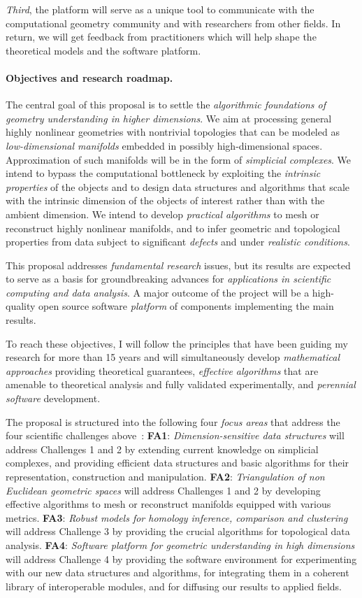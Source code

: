 {\em Third}, the platform will serve as a unique tool to communicate with the computational geometry community and with researchers from other fields. 
 In return, we will get feedback from practitioners which will help shape the theoretical models and the software platform.

\paragraph{Objectives and research roadmap.}
The central goal of this proposal is to settle the {\em algorithmic foundations of geometry understanding in higher dimensions}.  We aim at processing general highly nonlinear geometries with nontrivial topologies that can be modeled as  {\em low-dimensional manifolds} embedded in possibly high-dimensional spaces.  Approximation of such manifolds will be in the form of
{\em simplicial complexes}.  We intend to bypass the computational bottleneck by exploiting the {\em intrinsic properties} of the objects and to design data structures and algorithms that scale with the intrinsic dimension of the objects of interest rather than with the ambient dimension. We intend to develop {\em practical algorithms} to mesh or reconstruct highly nonlinear manifolds, and to infer geometric and topological properties from data subject to significant {\em defects} and under {\em realistic conditions}. 

This proposal addresses {\em fundamental
  research} issues, but its results are expected to serve as a basis
for groundbreaking advances for {\em applications in scientific computing
and data analysis}.  A major outcome of the project will be a
high-quality open source software {\em platform} of components
implementing the main results. 

To reach these objectives, I will follow the principles that have been
guiding my research for more than 15 years and will simultaneously
develop {\em mathematical approaches} providing theoretical
guarantees, {\em effective algorithms} that are amenable to
theoretical analysis and fully validated experimentally, and {\em
  perennial software} development.


The proposal is structured into the following four {\em focus areas}  that address the four scientific challenges above~:
{\bf FA1}:  {\em Dimension-sensitive data  structures} will address Challenges 1 and 2 by extending current knowledge on simplicial complexes, and  providing efficient data structures and basic algorithms for their representation, construction and manipulation. 
  {\bf FA2}:  {\em Triangulation of non Euclidean geometric spaces} will address Challenges 1 and 2 by developing effective algorithms to mesh or reconstruct manifolds equipped with various metrics.   {\bf FA3}: {\em Robust models for homology inference, comparison and  clustering} will address Challenge 3 by providing the crucial  algorithms for topological data analysis.
 {\bf FA4}:  {\em  Software platform for geometric understanding in high dimensions} will address Challenge 4 by providing the software environment for experimenting with our new data structures and algorithms, for integrating them in a coherent library of interoperable modules, and for diffusing our results to applied fields. 

